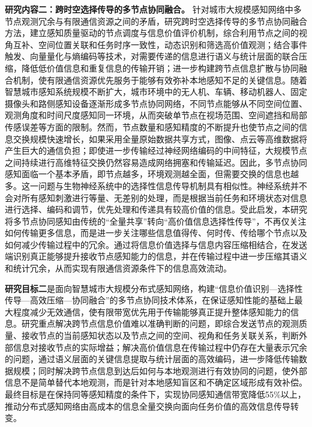 \textbf{研究内容二：跨时空选择传导的多节点协同融合。}
针对城市大规模感知网络中多节点观测冗余与有限通信资源之间的矛盾，研究跨时空选择传导的多节点协同融合方法，建立感知质量驱动的节点调度与信息价值评价机制，综合利用节点之间的视角互补、空间位置关联和任务时序一致性，动态识别和筛选高价值观测；结合事件触发、向量量化与熵编码等技术，对需要传递的信息进行语义与统计层面的联合压缩，降低低价值信息和重复信息的传输开销；进一步构建跨节点信息扩散与协同融合机制，使有限通信资源优先服务于能够有效弥补本地感知不足的关键信息。随着智慧城市感知系统规模不断扩大，城市环境中的无人机、车辆、移动机器人、固定摄像头和路侧感知设备逐渐形成多节点协同网络，不同节点能够从不同空间位置、观测角度和时间尺度感知同一环境，从而突破单节点在视场范围、空间遮挡和局部传感误差等方面的限制。然而，节点数量和感知精度的不断提升也使节点之间的信息交换规模快速增长，如果采用全量原始数据共享方式，图像、点云等高维数据将产生巨大的通信负担；即使进一步传输经过神经网络编码的中间特征，大规模节点之间持续进行高维特征交换仍然容易造成网络拥塞和传输延迟。因此，多节点协同感知面临一个基本矛盾，即节点越多，环境观测越全面，但需要交换的信息也越多。这一问题与生物神经系统中的选择性信息传导机制具有相似性。神经系统并不会对所有感知刺激进行等量、无差别的处理，而是根据当前任务和环境状态对信息进行选择、编码和调节，优先处理和传递具有较高价值的信息。受此启发，本研究将多节点协同感知由传统的“全量共享”转向“高价值信息选择性传导”，不再仅关注如何传输更多信息，而是进一步关注哪些信息值得传、何时传、传给哪个节点以及如何减少传输过程中的冗余。通过将信息价值选择与信息内容压缩相结合，在发送端识别真正能够提升接收节点感知能力的信息，并在传输过程中进一步压缩其语义和统计冗余，从而实现有限通信资源条件下的信息高效流动。

\textbf{研究目标二}是面向智慧城市大规模分布式感知网络，构建“信息价值识别—选择性传导—高效压缩—协同融合”的多节点协同技术体系，在保证感知性能的基础上最大程度减少无效通信，使有限带宽优先用于传输能够真正提升整体感知能力的信息。研究重点解决跨节点信息价值难以准确判断的问题，即综合发送节点的观测质量、接收节点的当前感知状态以及节点之间的空间、视角和任务关联关系，判断外部信息对接收节点的实际增益；解决高价值信息在传输过程中仍存在大量表示冗余的问题，通过语义层面的关键信息提取与统计层面的高效编码，进一步降低传输数据规模；同时解决跨节点信息到达后如何与本地观测进行有效协同的问题，使外部信息不是简单替代本地观测，而是针对本地感知盲区和不确定区域形成有效补偿。最终目标是在保持同等感知精度的条件下，实现协同感知通信带宽降低55\%以上，推动分布式感知网络由高成本的信息全量交换向面向任务价值的高效信息传导转变。

